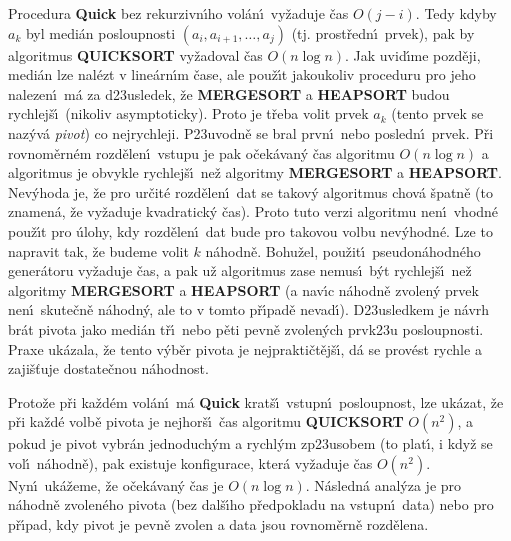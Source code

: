 \flushpar Procedura {\bf Quick} bez rekurzivn\'\i ho vol\'an\'\i\ 
vy\v zaduje \v cas $O(j-i)$. Tedy kdyby $a_k$ byl medi\'an 
posloupnosti $(a_i,a_{i+1},\dots,a_j)$ (tj. prost\v redn\'\i\ prvek), pak 
by algoritmus {\bf QUICKSORT} vy\-\v zadoval \v cas $O(n\log n)$. Jak 
uvid\'\i me pozd\v eji, medi\'an lze nal\'ezt v line\'ar\-n\'\i m \v case, ale 
pou\v z\'\i t jakoukoliv proceduru pro jeho nalezen\'\i\ m\'a za 
d\accent23usledek, \v ze {\bf MERGESORT} a {\bf HEAPSORT }
budou rychlej\v s\'\i\ (nikoliv asymptoticky). Proto je t\v reba 
volit prvek $a_k$ (tento prvek se naz\'yv\'a \emph{pivot}) co 
nejrychleji. P\accent23uvodn\v e se bral prvn\'\i\ nebo 
posledn\'\i\ prvek. P\v ri rovnom\v ern\'em rozd\v elen\'\i\ vstupu je 
pak o\v cek\'avan\'y \v cas algoritmu $O(n\log n)$ a algoritmus je 
obvykle rychlej\v s\'\i\ ne\v z algoritmy {\bf MERGESORT} a 
{\bf HEAPSORT}. Nev\'yhoda je, \v ze pro ur\v cit\'e rozd\v elen\'\i\ dat se 
takov\'y algoritmus chov\'a \v spatn\v e (to znamen\'a, \v ze 
vy\v zaduje kvadra\-tick\'y \v cas). Proto tuto 
verzi algoritmu nen\'\i\ vhodn\'e pou\v z\'\i t pro \'ulohy, kdy 
rozd\v elen\'\i\ dat bude pro takovou volbu nev\'yhodn\'e. 
Lze to napravit tak, \v ze budeme volit $k$ n\'ahodn\v e. Bohu\v zel, 
pou\v zit\'\i\ pseudon\'ahodn\'eho gener\'atoru vy\v zaduje \v cas, a pak 
u\v z algoritmus zase nemus\'\i\ b\'yt rychlej\v s\'\i\ ne\v z algoritmy 
{\bf MERGESORT} a {\bf HEAPSORT} (a nav\'\i c n\'ahodn\v e zvolen\'y 
prvek nen\'\i\ skute\v cn\v e n\'ahodn\'y, ale to v tomto p\v r\'\i pad\v e 
nevad\'\i ). D\accent23usledkem je n\'avrh br\'at pivota jako 
medi\'an t\v r\'\i\ nebo p\v eti pevn\v e zvolen\'ych prvk\accent23u 
posloupnosti. Praxe uk\'azala, \v ze tento v\'yb\v er pivota je 
nej\-prakti\v ct\v ej\v s\'\i , d\'a se prov\'est rychle a zaji\v s\v tuje 
dostate\v cnou n\'a\-hod\-nost.
\medskip

\flushpar Proto\v ze p\v ri ka\v zd\'em vol\'an\'\i\ m\'a {\bf Quick} krat\v s\'\i\ 
vstupn\'\i\ posloupnost, lze uk\'azat, \v ze p\v ri ka\v zd\'e volb\v e 
pivota je nejhor\v s\'\i\ \v cas algoritmu {\bf QUICKSORT} $O(n^2
)$, a 
pokud je pivot vybr\'an jedno\-du\-ch\'ym a rychl\'ym 
zp\accent23usobem (to plat\'\i , i kdy\v z se vol\'\i\ n\'ahodn\v e), pak 
exi\-stuje konfigurace, kter\'a vy\v zaduje \v cas $O(n^2)$. Nyn\'\i\ 
uk\'a\-\v zeme, \v ze o\v cek\'avan\'y \v cas je $O(n\log n)$. N\'asledn\'a anal\'y\-za 
je pro n\'a\-hod\-n\v e zvolen\'eho pivota (bez dal\v s\'\i ho p\v redpokladu na 
vstupn\'\i\ data) nebo pro p\v r\'\i pad, kdy pivot je pevn\v e zvolen a data 
jsou rovno\-m\v ern\v e rozd\v e\-lena.
\medskip

